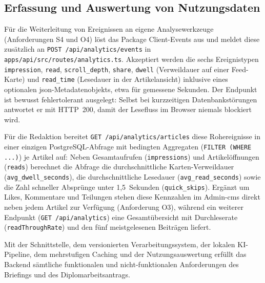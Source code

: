 \subsection{Erfassung und Auswertung von Nutzungsdaten}

Für die Weiterleitung von Ereignissen an eigene Analysewerkzeuge (Anforderungen S4 und O4) löst das Package Client-Events aus und meldet diese zusätzlich an \texttt{POST /api/analytics/events} in \texttt{apps/api/src/routes/analytics.ts}.
Akzeptiert werden die sechs Ereignistypen \texttt{impression}, \texttt{read}, \texttt{scroll\_depth}, \texttt{share}, \texttt{dwell} (Verweildauer auf einer Feed-Karte) und \texttt{read\_time} (Lesedauer in der Artikelansicht) inklusive eines optionalen \gls{json}-Metadatenobjekts, etwa für gemessene Sekunden.
Der Endpunkt ist bewusst fehlertolerant ausgelegt: Selbst bei kurzzeitigen Datenbankstörungen antwortet er mit HTTP~200, damit der Lesefluss im Browser niemals blockiert wird.

Für die Redaktion bereitet \texttt{GET /api/analytics/articles} diese Rohereignisse in einer einzigen PostgreSQL-Abfrage mit bedingten Aggregaten (\texttt{FILTER (WHERE ...)}) je Artikel auf:
Neben Gesamtaufrufen (\texttt{impressions}) und Artikelöffnungen (\texttt{reads}) berechnet die Abfrage die durchschnittliche Karten-Verweildauer (\texttt{avg\_dwell\_seconds}), die durchschnittliche Lesedauer (\texttt{avg\_read\_seconds}) sowie die Zahl schneller Absprünge unter 1,5~Sekunden (\texttt{quick\_skips}).
Ergänzt um Likes, Kommentare und Teilungen stehen diese Kennzahlen im Admin-\gls{cms} direkt neben jedem Artikel zur Verfügung (Anforderung O3), während ein weiterer Endpunkt (\texttt{GET /api/analytics}) eine Gesamtübersicht mit Durchleserate (\texttt{readThroughRate}) und den fünf meistgelesenen Beiträgen liefert.

Mit der Schnittstelle, dem versionierten Verarbeitungssystem, der lokalen KI-Pipeline, dem mehrstufigen Caching und der Nutzungsauswertung erfüllt das Backend sämtliche funktionalen und nicht-funktionalen Anforderungen des Briefings und des Diplomarbeitsantrags.
